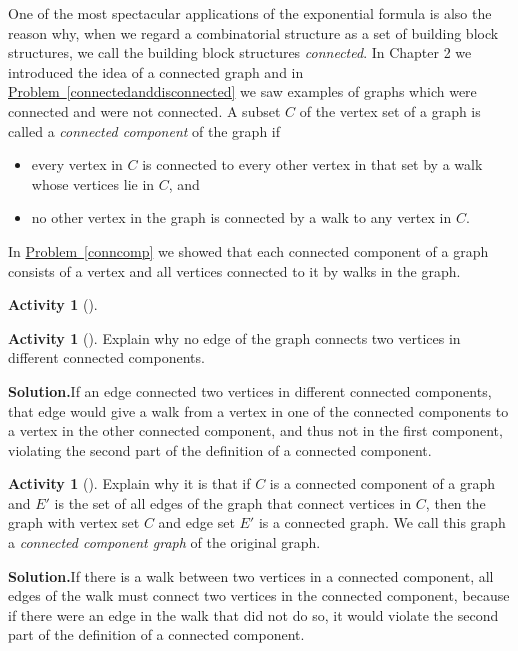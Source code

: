\documentclass[10pt,]{book}
\theoremstyle{plain}
\theoremstyle{definition}
\newtheorem{activity}[project]{Activity}
\numberwithin{equation}{chapter}
\begin{document}
One of the most spectacular applications of the exponential formula is also the reason why, when we regard a combinatorial structure as a set of building block structures, we call the building block structures \emph{connected}. In Chapter 2 we introduced the idea of a connected graph and in \hyperref[connectedanddisconnected]{Problem~\ref{connectedanddisconnected}} we saw examples of graphs which were connected and were not connected. A subset \(C\) of the vertex set of a graph is called a \emph{connected component} of the graph if \leavevmode%
\begin{itemize}[label=\textbullet]
\item{}every vertex in \(C\) is connected to every other vertex in that set by a walk whose vertices lie in \(C\), and%
\item{}no other vertex in the graph is connected by a walk to any vertex in \(C\).%
\end{itemize}
%
\par
In \hyperref[conncomp]{Problem~\ref{conncomp}} we showed that each connected component of a graph consists of a vertex and all vertices connected to it by walks in the graph.%
\begin{activity}[]\label{activity-392}
\end{activity}
\begin{activity}[]\label{activity-393}
Explain why no edge of the graph connects two vertices in different connected components.%
\par\medskip\noindent%
\textbf{Solution.}\quad If an edge connected two vertices in different connected components, that edge would give a walk from a vertex in one of the connected components to a vertex in the other connected component, and thus not in the first component, violating the second part of the definition of a connected component.%
\end{activity}
\begin{activity}[]\label{activity-394}
Explain why it is that if \(C\) is a connected component of a graph and \(E'\) is the set of all edges of the graph that connect vertices in \(C\), then the graph with vertex set \(C\) and edge set \(E'\) is a connected graph. We call this graph a \emph{connected component graph} of the original graph.%
\par\medskip\noindent%
\textbf{Solution.}\quad If there is a walk between two vertices in a connected component, all edges of the walk must connect two vertices in the connected component, because if there were an edge in the walk that did not do so, it would violate the second part of the definition of a connected component.%
\end{activity}
\end{document}
